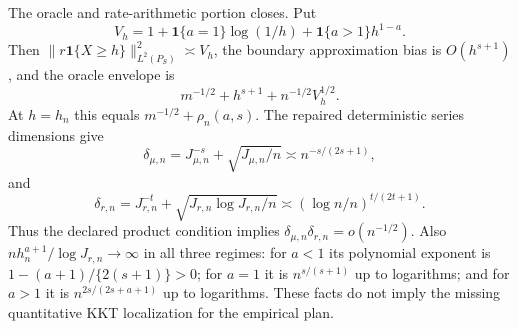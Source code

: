 The oracle and rate-arithmetic portion closes. Put
\[
V_h=1+\mathbf 1\{a=1\}\log(1/h)+\mathbf 1\{a>1\}h^{1-a}.
\]
Then \(\|r\mathbf 1\{X\ge h\}\|_{L^2(P_S)}^2\asymp V_h\), the boundary approximation bias is \(O(h^{s+1})\), and the oracle envelope is
\[
m^{-1/2}+h^{s+1}+n^{-1/2}V_h^{1/2}.
\]
At \(h=h_n\) this equals \(m^{-1/2}+\rho_n(a,s)\). The repaired deterministic series dimensions give
\[
\delta_{\mu,n}=J_{\mu,n}^{-s}+\sqrt{J_{\mu,n}/n}\asymp n^{-s/(2s+1)},
\]
and
\[
\delta_{r,n}=J_{r,n}^{-t}+\sqrt{J_{r,n}\log J_{r,n}/n}\asymp(\log n/n)^{t/(2t+1)}.
\]
Thus the declared product condition implies \(\delta_{\mu,n}\delta_{r,n}=o(n^{-1/2})\). Also \(nh_n^{a+1}/\log J_{r,n}\to\infty\) in all three regimes: for \(a<1\) its polynomial exponent is \(1-(a+1)/\{2(s+1)\}>0\); for \(a=1\) it is \(n^{s/(s+1)}\) up to logarithms; and for \(a>1\) it is \(n^{2s/(2s+a+1)}\) up to logarithms. These facts do not imply the missing quantitative KKT localization for the empirical plan.
